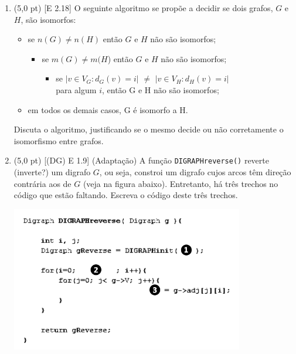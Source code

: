 \documentclass[12pt,a4paper,oneside]{article}
\begin{document}
\begin{enumerate}

	\item (5,0 pt) [E 2.18] O seguinte algoritmo se propõe a decidir se dois grafos, $G$ e $H$, são isomorfos:
		\begin{itemize}
			\item[] se $n(G) \not= n(H)$ então $G$ e $H$ não são isomorfos;
				\begin{itemize}
					\item[] se $m(G) \not= m(H$) então $G$ e $H$ não são isomorfos;
					\begin{itemize}
						\item[]  se $|{v \in V_G : d_G (v) = i}|$ $\not=$ $|{v \in V_H : d_H (v) = i}|$ \\
						para algum $i$, então G e H não são isomorfos;
					\end{itemize}
				\end{itemize}
			\item[] em todos os demais casos, G é isomorfo a H.
		\end{itemize}
		
	Discuta o algoritmo, justificando se o mesmo decide ou não corretamente o isomorfismo entre grafos.
	
	\item (5,0 pt) [(DG) E 1.9] (Adaptação) A função {\tt DIGRAPHreverse()} reverte (inverte?) um digrafo $G$, ou seja, constroi um digrafo cujos arcos têm direção contrária aos de $G$ (veja na figura abaixo). Entretanto, há três trechos no código que estão faltando. Escreva o código deste três trechos.
	\begin{center}
		\includegraphics[width=0.8\textwidth]{images/reverse2.png}
	\end{center}
	
	\end{enumerate}
\end{document}
